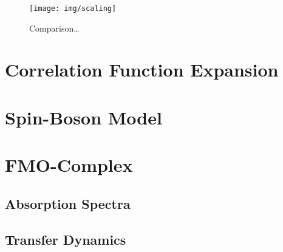 \begin{figure}
\begin{center}
    \texttt{[image: img/scaling]}
\end{center}
\caption{Comparison\dots}
\label{fig:num.scaling}
\end{figure}


\section{Correlation Function Expansion}
\label{sec:num.expansion}


\section{Spin-Boson Model}
\label{sec:num.spin_boson}


\section{FMO-Complex}
\label{sec:num.fmo}


\subsection{Absorption Spectra}
\label{sub:num.fmo.absorption}

\subsection{Transfer Dynamics}
\label{sub:num.fmo.dynamics}

